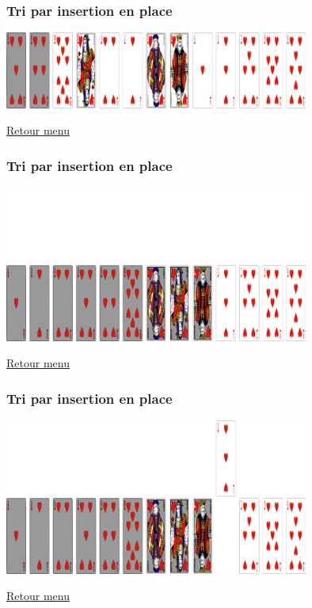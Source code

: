 \documentclass[svgnames,11pt]{beamer}
\begin{document}
\begin{frame}
    \frametitle{Tri par insertion en place}

    \begin{center}
        \centering
        \includegraphics[width=10cm]{ressources/insertion-5.png}
        \label{pique}
    \end{center}
    \hyperlink{menu}{Retour menu}

\end{frame}

\begin{frame}
    \frametitle{Tri par insertion en place}

    \begin{center}
        \centering
        \includegraphics[width=10cm]{ressources/insertion-5-5.png}
        \label{pique}
    \end{center}
    \hyperlink{menu}{Retour menu}

\end{frame}

\begin{frame}
    \frametitle{Tri par insertion en place}

    \begin{center}
        \centering
        \includegraphics[width=10cm]{ressources/insertion-6.png}
        \label{pique}
    \end{center}
    \hyperlink{menu}{Retour menu}

\end{frame}
\end{document}
